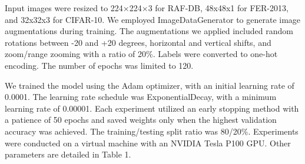 \documentclass[pdflatex,sn-mathphys-num]{sn-jnl}%
\theoremstyle{thmstyleone}%
\theoremstyle{thmstyletwo}%
\theoremstyle{thmstylethree}%
\begin{document}
Input images were resized to 224×224×3 for RAF-DB, 48x48x1 for FER-2013, and 32x32x3 for CIFAR-10. We employed ImageDataGenerator to generate image augmentations during training. The augmentations we applied included random rotations between -20 and +20 degrees, horizontal and vertical shifts, and zoom/range zooming with a ratio of 20\%. Labels were converted to one-hot encoding. The number of epochs was limited to 120.

We trained the model using the Adam optimizer, with an initial learning rate of 0.0001. The learning rate schedule was ExponentialDecay, with a minimum learning rate of 0.00001. Each experiment utilized an early stopping method with a patience of 50 epochs and saved weights only when the highest validation accuracy was achieved. The training/testing split ratio was 80/20\%. Experiments were conducted on a virtual machine with an NVIDIA Tesla P100 GPU. Other parameters are detailed in Table 1.
\end{document}
